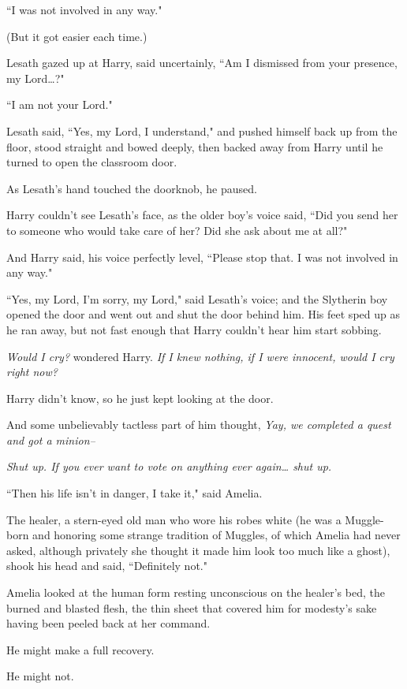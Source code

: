 ``I was not involved in any way."

(But it got easier each time.)

Lesath gazed up at Harry, said uncertainly, ``Am I dismissed from your presence, my Lord{\ldots}?"

``I am not your Lord."

Lesath said, ``Yes, my Lord, I understand," and pushed himself back up from the floor, stood straight and bowed deeply, then backed away from Harry until he turned to open the classroom door.

As Lesath's hand touched the doorknob, he paused.

Harry couldn't see Lesath's face, as the older boy's voice said, ``Did you send her to someone who would take care of her? Did she ask about me at all?"

And Harry said, his voice perfectly level, ``Please stop that. I was not involved in any way."

``Yes, my Lord, I'm sorry, my Lord," said Lesath's voice; and the Slytherin boy opened the door and went out and shut the door behind him. His feet sped up as he ran away, but not fast enough that Harry couldn't hear him start sobbing.

\emph{Would I cry?} wondered Harry. \emph{If I knew nothing, if I were innocent, would I cry right now?}

Harry didn't know, so he just kept looking at the door.

And some unbelievably tactless part of him thought, \emph{Yay, we completed a quest and got a minion\---}

\emph{Shut up. If you ever want to vote on anything ever again{\ldots} shut up.}


``Then his life isn't in danger, I take it," said Amelia.

The healer, a stern-eyed old man who wore his robes white (he was a Muggle-born and honoring some strange tradition of Muggles, of which Amelia had never asked, although privately she thought it made him look too much like a ghost), shook his head and said, ``Definitely not."

Amelia looked at the human form resting unconscious on the healer's bed, the burned and blasted flesh, the thin sheet that covered him for modesty's sake having been peeled back at her command.

He might make a full recovery.

He might not.

